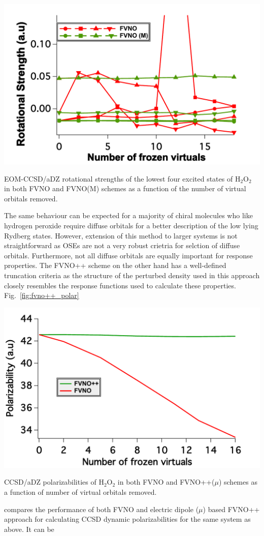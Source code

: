 \begin{MyFigure}[h!]
\centering
\includegraphics[width=0.6\linewidth]{figures_fvno++/fvno(m)_h2o2_adz_rs.pdf}
\caption{{\footnotesize EOM-CCSD/aDZ rotational strengths of the lowest four excited states of H$_2$O$_2$ in both FVNO and FVNO(M) schemes as a function of the number of virtual orbitals removed.}}
\label{fig:fvno(m)_rs}
\end{MyFigure}
The same behaviour can be expected for a majority of chiral molecules who 
like hydrogen peroxide require diffuse orbitals for a better description of the low lying 
Rydberg states.  However, extension of this method to larger systems is not 
straightforward as OSEs are not a very robust crietria for selction of diffuse 
orbitals. Furthermore, not all diffuse orbitals are equally important for 
response properties. The FVNO++ scheme on the other hand has a well-defined 
truncation criteria as the structure of the perturbed density used in this 
approach closely resembles the response functions used to calculate these 
properties. Fig.~\ref{fig:fvno++_polar} 
\begin{MyFigure}[h!]
\centering
\includegraphics[width=0.6\linewidth]{figures_fvno++/fvno++_h2o2_adz_polar.pdf}
\caption{{\footnotesize CCSD/aDZ polarizabilities of
H$_2$O$_2$ in both FVNO and FVNO++($\mu$) schemes as a function of
number of virtual orbitals removed.}}
\label{fig:fvno++_polar}
\end{MyFigure}
compares the performance of both FVNO and electric dipole ($\mu$) based FVNO++ approach 
for calculating CCSD dynamic polarizabilities for the same system as above. It can be
